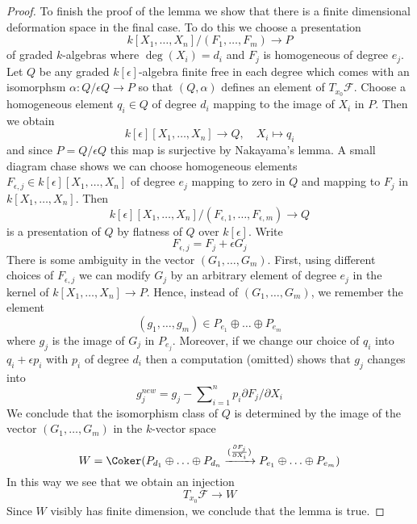 \begin{proof}
\medskip\noindent
To finish the proof of the lemma we show that there is a finite
dimensional deformation space in the final case. To do this we
choose a presentation
$$
k[X_1, \ldots, X_n]/(F_1, \ldots, F_m) \longrightarrow P
$$
of graded $k$-algebras where $\deg(X_i) = d_i$ and
$F_j$ is homogeneous of degree $e_j$.
Let $Q$ be any graded $k[\epsilon]$-algebra
finite free in each degree which comes with an isomorphsm
$\alpha : Q/\epsilon Q \to P$ so that $(Q, \alpha)$ defines
an element of $T_{x_0}\mathcal{F}$.
Choose a homogeneous element $q_i \in Q$ of degree $d_i$
mapping to the image of $X_i$ in $P$.
Then we obtain
$$
k[\epsilon][X_1, \ldots, X_n] \longrightarrow Q,\quad
X_i \longmapsto q_i
$$
and since $P = Q/\epsilon Q$ this map is surjective by Nakayama's lemma.
A small diagram chase shows we can choose homogeneous elements
$F_{\epsilon, j} \in k[\epsilon][X_1, \ldots, X_n]$ of degree $e_j$
mapping to zero in $Q$ and mapping to $F_j$ in $k[X_1, \ldots, X_n]$.
Then
$$
k[\epsilon][X_1, \ldots, X_n]/(F_{\epsilon, 1}, \ldots, F_{\epsilon, m})
\longrightarrow Q
$$
is a presentation of $Q$ by flatness of $Q$ over $k[\epsilon]$.
Write
$$
F_{\epsilon, j} =  F_j + \epsilon G_j
$$
There is some ambiguity in the vector $(G_1, \ldots, G_m)$.
First, using different choices of $F_{\epsilon, j}$
we can modify $G_j$ by an arbitrary element of degree $e_j$
in the kernel of $k[X_1, \ldots, X_n] \to P$.
Hence, instead of $(G_1, \ldots, G_m)$, we remember the
element
$$
(g_1, \ldots, g_m) \in P_{e_1} \oplus \ldots \oplus P_{e_m}
$$
where $g_j$ is the image of $G_j$ in $P_{e_j}$.
Moreover, if we change our choice of $q_i$ into $q_i + \epsilon p_i$
with $p_i$ of degree $d_i$ then a computation (omitted) shows
that $g_j$ changes into
$$
g_j^{new} = g_j - \sum\nolimits_{i = 1}^n p_i \partial F_j / \partial X_i
$$
We conclude that the isomorphism class of $Q$ is determined by the
image of the vector $(G_1, \ldots, G_m)$ in the $k$-vector space
$$
W  = \Coker(P_{d_1} \oplus \ldots \oplus P_{d_n}
\xrightarrow{(\frac{\partial F_j}{\partial X_i})}
P_{e_1} \oplus \ldots \oplus P_{e_m})
$$
In this way we see that we obtain an injection
$$
T_{x_0}\mathcal{F} \longrightarrow W
$$
Since $W$ visibly has finite dimension, we conclude that the lemma is true.
\end{proof}



























